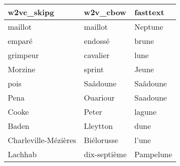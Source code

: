 \begin{tabular}{lll}
\toprule
           w2vc\_skipg &      w2v\_cbow &   fasttext \\
\midrule
              maillot &       maillot &    Neptune \\
               emparé &       endossé &      brune \\
             grimpeur &      cavalier &       lune \\
              Morzine &        sprint &      Jeune \\
                 pois &      Saâdoune &   Saâdoune \\
                 Pena &      Ouariour &   Saadoune \\
                Cooke &         Peter &     lagune \\
                Baden &      Lleytton &       dune \\
 Charleville-Mézières &    Biélorusse &      l'une \\
              Lachhab &  dix-septième &  Pampelune \\
\bottomrule
\end{tabular}
